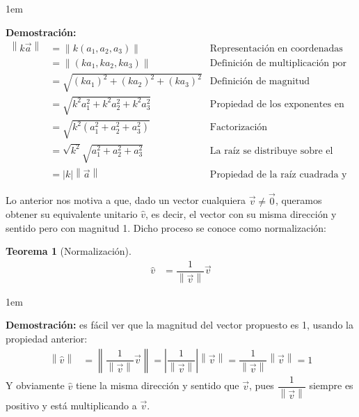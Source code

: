 \documentclass[12pt, fleqn]{report}                             %
\newenvironment{SmallIndentation}[1][0.75em]                    %
    {\begin{adjustwidth}{#1}{}\begin{footnotesize}}                 %
    {\end{footnotesize}\end{adjustwidth}}                           %
\newcommand{\abs}[1]{\left\lvert #1 \right\lvert}               %
\newcommand{\Abs}[1]{\left\lVert #1 \right\lVert}               %
\newtheorem{Theorem}{Teorema}[section]                          %
\begin{document}
            \begin{SmallIndentation}[1em]
                \textbf{Demostración:}
                \begin{align*}
                    \Abs{k\vec{a}} &= \Abs{k(a_1, a_2, a_3)} &\mbox{Representación en coordenadas}\\
                    &= \Abs{(ka_1, ka_2, ka_3)} &\mbox{Definición de multiplicación por escalar}\\
                    &= \sqrt{(ka_1)^2 + (ka_2)^2 + (ka_3)^2} &\mbox{Definición de magnitud}\\
                    &= \sqrt{k^2a_1^2 + k^2a_2^2 + k^2a_3^2} &\mbox{Propiedad de los exponentes en los reales}\\
                    &= \sqrt{k^2(a_1^2 + a_2^2 + a_3^2)} &\mbox{Factorización}\\
                    &= \sqrt{k^2}\sqrt{a_1^2 + a_2^2 + a_3^2} &\mbox{La raíz se distribuye sobre el producto de reales}\\
                    &= \abs{k} \Abs{\vec{a}} &\mbox{Propiedad de la raíz cuadrada y definición de magnitud}
                \end{align*}
            \end{SmallIndentation}
        
            Lo anterior nos motiva a que, dado un vector cualquiera $\vec{v} \neq \vec{0}$, queramos obtener su equivalente unitario $\hat{v}$, es decir, el vector con su misma dirección y sentido pero con magnitud 1. Dicho proceso se conoce como normalización:
            \begin{Theorem}[Normalización]
                \begin{align}
                    \hat{v} &= \dfrac{1}{\Abs{\vec{v}}} \vec{v}
                \end{align}
            \end{Theorem}
        
            \begin{SmallIndentation}[1em]
                \textbf{Demostración:} es fácil ver que la magnitud del vector propuesto es 1, usando la propiedad anterior:
                \begin{align*}
                    \Abs{\hat{v}} &= \Abs{\dfrac{1}{\Abs{\vec{v}}} \vec{v}} = \abs{\dfrac{1}{\Abs{\vec{v}}}} \Abs{\vec{v}} = \dfrac{1}{\Abs{\vec{v}}} \Abs{\vec{v}} = 1
                \end{align*}
                Y obviamente $\hat{v}$ tiene la misma dirección y sentido que $\vec{v}$, pues $\dfrac{1}{\Abs{\vec{v}}}$ siempre es positivo y está multiplicando a $\vec{v}$.
            \end{SmallIndentation}
            
\end{document}
